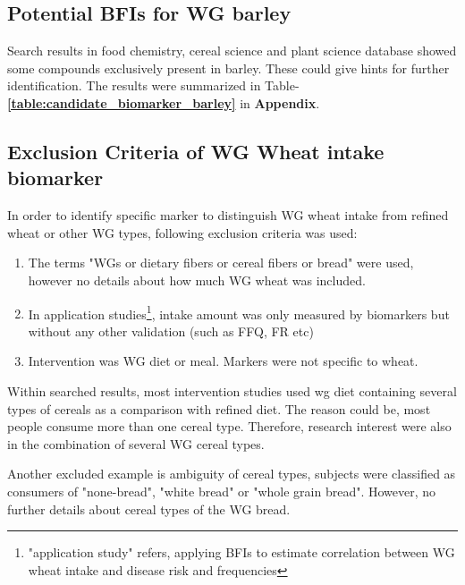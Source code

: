 \subsection{Potential BFIs for WG barley}
Search results in food chemistry, cereal science and plant science database showed some compounds exclusively present in barley. These could give hints for further identification. The results were summarized in Table-\textbf{\ref{table:candidate_biomarker_barley}} in \textbf{Appendix}.


\subsection{Exclusion Criteria of WG Wheat intake biomarker}
In order to identify specific marker to distinguish WG wheat intake from refined wheat or other WG types, following exclusion criteria was used:
\begin{enumerate}
	\item The terms "WGs or dietary fibers or cereal fibers or bread" were used, however no details about how much WG wheat was included.
	\item In application studies\footnote{"application study" refers, applying BFIs to estimate correlation between WG wheat intake and disease risk and frequencies}, intake amount was only measured by biomarkers but without any other validation (such as FFQ, FR etc)
	\item Intervention was WG diet or meal. Markers were not specific to wheat.
\end{enumerate}

Within searched results, most intervention studies used \acrshort{wg} diet containing several types of cereals as a comparison with refined diet. The reason could be, most people consume more than one cereal type. Therefore, research interest were also in the combination of several WG cereal types. 

Another excluded example is ambiguity of cereal types\cite{ISI:000348343300015}, subjects were classified as consumers of "none-bread", "white bread" or "whole grain bread". However, no further details about cereal types of the WG bread.

